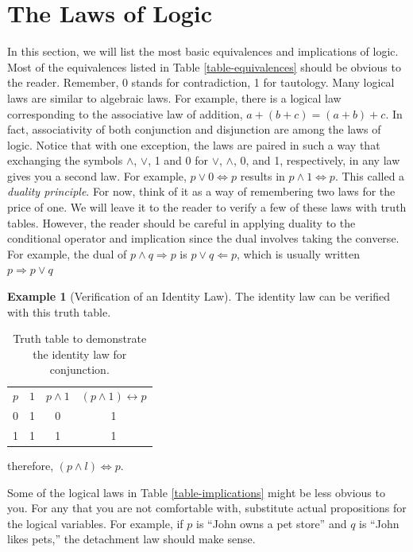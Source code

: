 \documentclass[10pt,]{book}
\theoremstyle{plain}
\theoremstyle{definition}
\theoremstyle{definition}
\theoremstyle{definition}
\newtheorem{example}[theorem]{Example}
\theoremstyle{definition}
\begin{document}
\section[The Laws of Logic]{The Laws of Logic}\label{c3s4}
In this section, we will list the most basic equivalences and implications of logic. Most of the equivalences listed in Table \hyperref[table-equivalences]{\ref{table-equivalences}} should be obvious
to the reader. Remember, 0 stands for contradiction, 1 for tautology.  Many logical laws are similar to algebraic laws.  For example, there is
a logical law corresponding to the associative law of addition, \(a + (b + c) = (a + b) + c\).  In fact, associativity of both
conjunction and disjunction are among the laws of logic. Notice that with one exception, the laws are paired in such a way that exchanging
the symbols \(\land\), \(\lor\), 1 and 0 for \(\lor\), \(\land\), 0, and 1, respectively, in any law gives you a second law. For example,  \(p
\lor  0\Leftrightarrow p\) results in \(p \land  1 \Leftrightarrow p\). This called a \emph{duality principle}. For now, think
of it as a way of remembering two laws for the price of one. We will leave it to the reader to verify a few of these laws with truth tables. However,
the reader should be careful in applying duality to the conditional operator and implication since the dual involves taking the converse. For example,
the dual of \(p \land  q\Rightarrow p\) is \(p \lor  q \Leftarrow  p\), which is usually written \(p\Rightarrow p \lor  q\)
%
\begin{example}[Verification of an Identity Law]\label{ex-identity-and}
The identity law can be verified with this truth table.%
\leavevmode%
\begin{table}
\centering
\begin{tabular}{cccc}
\(p\) &\( 1\) & \(p\land 1 \)& \((p\land 1)\leftrightarrow p\) \tabularnewline[0pt]
0 & 1 & 0 & 1 \tabularnewline[0pt]
1 & 1 & 1 & 1 
\end{tabular}
\caption{Truth table to demonstrate the identity law for conjunction.\label{tt-identity-and}}
\end{table}
\par
therefore, \((p \land  l)\iff p\).%
\end{example}
\par
Some of the logical laws in Table \hyperref[table-implications]{\ref{table-implications}} might be less obvious to you.
 For any that you are not comfortable with, substitute actual propositions for the logical variables. For example, if \(p\) is ``John owns a pet store'' and \(q\) is ``John likes pets,'' the detachment law should make sense.%
\end{document}
